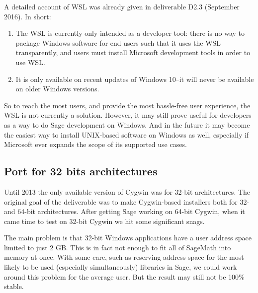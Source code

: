 A detailed account of WSL was already given in deliverable D2.3
(September 2016). In short:
\begin{enumerate}
\def\labelenumi{\arabic{enumi})}
\item The WSL is currently only intended as a developer tool: there is no way
    to package Windows software for end users such that it uses the WSL
    transparently, and users must install Microsoft development tools in order
    to use WSL.

\item It is only available on recent updates of Windows 10--it will never be
    available on older Windows versions.
\end{enumerate}

So to reach the most users, and provide the most hassle-free user experience,
the WSL is not currently a solution.  However, it may still prove useful for
developers as a way to do Sage development on Windows. And in the future it may
become the easiest way to install UNIX-based software on Windows as well,
especially if Microsoft ever expands the scope of its supported use cases.

\hypertarget{port-for-32-bits-architectures}{%
\subsection{Port for 32 bits
architectures}\label{port-for-32-bits-architectures}}

Until 2013 the only available version of Cygwin was for 32-bit
architectures. The original goal of the deliverable was to make
Cygwin-based installers both for 32- and 64-bit architectures. After
getting Sage working on 64-bit Cygwin, when it came time to test on
32-bit Cygwin we hit some significant snags.

The main problem is that 32-bit Windows applications have a user address
space limited to just 2 GB. This is in fact not enough to fit all of
SageMath into memory at once. With some care, such as reserving address
space for the most likely to be used (especially simultaneously)
libraries in Sage, we could work around this problem for the average user.
But the result may still not be 100\% stable.

